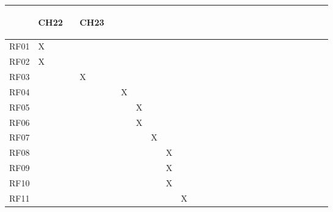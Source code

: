 \begin{table}[htb]
\begin{tabular}{|l|l|l|l|l|l|l|l|l|l|l|l|l|l|l|l|l|l|l|l|l|l|l|l|}
\end{turn} & \begin{turn}{90}CH22 \ \end{turn} & \begin{turn}{90}CH23 \ \end{turn} \\ \hline
RF01&   X   &      &      &      &      &      &      &      &      &      &      &      &      &      &      &      &      &      &      &      &      &      &      \\ \hline
RF02&   X  &      &      &      &      &      &      &      &      &      &      &      &      &      &      &      &      &      &      &      &      &      &      \\ \hline
RF03&      &   X   &      &      &      &      &      &      &      &      &      &      &      &      &      &      &      &      &      &      &      &      &      \\ \hline
RF04&      &      &   X   &      &      &      &      &      &      &      &      &      &      &      &      &      &      &      &      &      &      &      &      \\ \hline
RF05&      &      &      &   X   &      &      &      &      &      &      &      &      &      &      &      &      &      &      &      &      &      &      &      \\ \hline
RF06&      &      &      &   X   &      &      &      &      &      &      &      &      &      &      &      &      &      &      &      &      &      &      &      \\ \hline
RF07&      &      &      &      &   X   &      &      &      &      &      &      &      &      &      &      &      &      &      &      &      &      &      &      \\ \hline
RF08&      &      &      &      &      &    X  &      &      &      &      &      &      &      &      &      &      &      &      &      &      &      &      &      \\ \hline
RF09&      &      &      &      &      &    X  &      &      &      &      &      &      &      &      &      &      &      &      &      &      &      &      &      \\ \hline
RF10&      &      &      &      &      &    X  &      &      &      &      &      &      &      &      &      &      &      &      &      &      &      &      &      \\ \hline
RF11&      &      &      &      &      &      &   X   &      &      &      &      &      &      &      &      &      &      &      &      &      &      &      &      \\ \hline

\end{tabular}
\end{table}
